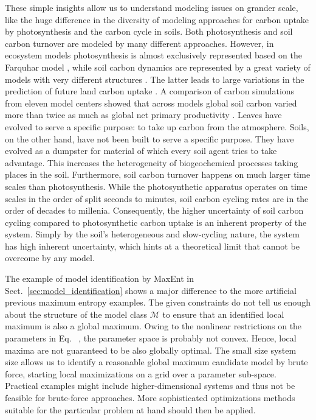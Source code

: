 \documentclass[smallextended]{svjour3}
\makeatletter
\renewcommand*{\eqref}[1]{%
  \hyperref[{#1}]{\textup{\tagform@{\ref*{#1}}}}%
}
\makeatother
\begin{document}
These simple insights allow us to understand modeling issues on grander scale, like the huge difference in the diversity of modeling approaches for carbon uptake by photosynthesis and the carbon cycle in soils.
Both photosynthesis \citep{garcia2022mathematical} and soil carbon turnover \citep{manzoni2009soil} are modeled by many different approaches.
However, in ecosystem models photosynthesis is almost exclusively represented based \citep{zaehle2014evaluation} on the Farquhar model \citep{farquhar1980biochemical}, while soil carbon dynamics are represented by a great variety of models with very different structures \citep{friedlingstein2006climate}.
The latter leads to large variations in the prediction of future land carbon uptake \citep{friedlingstein2006climate,friedlingstein2014uncertainties}.
A comparison of carbon simulations from eleven model centers showed that across models global soil carbon varied more than twice as much as global net primary productivity \citep{todd2013causes}.
Leaves have evolved to serve a specific purpose: to take up carbon from the atmosphere.
Soils, on the other hand, have not been built to serve a specific purpose.
They have evolved as a dumpster for material of which every soil agent tries to take advantage.
This increases the heterogeneity of biogeochemical processes taking places in the soil.
Furthermore, soil carbon turnover happens on much larger time scales than photosynthesis.
While the photosynthetic apparatus operates on time scales in the order of split seconds to minutes, soil carbon cycling rates are in the order of decades to millenia.
Consequently, the higher uncertainty of soil carbon cycling compared to photosynthetic carbon uptake is an inherent property of the system.
Simply by the soil's heterogeneous and slow-cycling nature, the system has high inherent uncertainty, which hints at a theoretical limit that cannot be overcome by any model.

The example of model identification by MaxEnt in Sect.~\ref{sec:model_identification} shows a major difference to the more artificial previous maximum entropy examples.
The given constraints do not tell us enough about the structure of the model class $\mathcal{M}$ to ensure that an identified local maximum is also a global maximum.
Owing to the nonlinear restrictions on the parameters in Eq.~\eqref{eqn:measurement_data}, the parameter space is probably not convex.
Hence, local maxima are not guaranteed to be also globally optimal.
The small size system size allows us to identify a reasonable global maximum candidate model by brute force, starting local maximizations on a grid over a parameter sub-space.
Practical examples might include higher-dimensional systems and thus not be feasible for brute-force approaches.
More sophisticated optimizations methods suitable for the particular problem at hand should then be applied.
\end{document}
